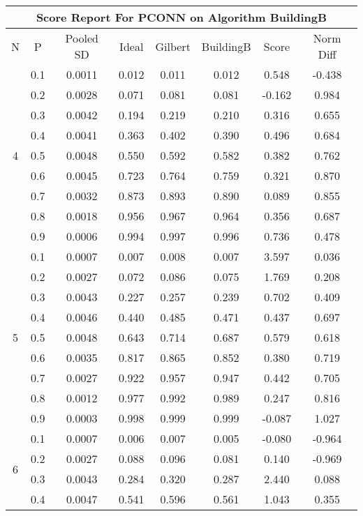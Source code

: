\documentclass[11pt,a4paper]{report}
\begin{document}
\begin{longtable}{ | c | c || c | c | c | c | c | c | }
\hline
\multicolumn{8}{|c|}{ Score Report For PCONN on Algorithm BuildingB} \\
\hline
N & P & Pooled SD &  Ideal &  Gilbert & BuildingB  & Score & Norm Diff \\
 \hline
 \hline
 \endhead
\multirow{9}{*}{4} & 0.1 & 0.0011 & 0.012 & 0.011 & 0.012 & 0.548 & -0.438 \\
 & 0.2 & 0.0028 & 0.071 & 0.081 & 0.081 & -0.162 & 0.984 \\
 & 0.3 & 0.0042 & 0.194 & 0.219 & 0.210 & 0.316 & 0.655 \\
 & 0.4 & 0.0041 & 0.363 & 0.402 & 0.390 & 0.496 & 0.684 \\
 & 0.5 & 0.0048 & 0.550 & 0.592 & 0.582 & 0.382 & 0.762 \\
 & 0.6 & 0.0045 & 0.723 & 0.764 & 0.759 & 0.321 & 0.870 \\
 & 0.7 & 0.0032 & 0.873 & 0.893 & 0.890 & 0.089 & 0.855 \\
 & 0.8 & 0.0018 & 0.956 & 0.967 & 0.964 & 0.356 & 0.687 \\
 & 0.9 & 0.0006 & 0.994 & 0.997 & 0.996 & 0.736 & 0.478 \\
 \hline
\multirow{9}{*}{5} & 0.1 & 0.0007 & 0.007 & 0.008 & 0.007 & 3.597 & 0.036 \\
 & 0.2 & 0.0027 & 0.072 & 0.086 & 0.075 & 1.769 & 0.208 \\
 & 0.3 & 0.0043 & 0.227 & 0.257 & 0.239 & 0.702 & 0.409 \\
 & 0.4 & 0.0046 & 0.440 & 0.485 & 0.471 & 0.437 & 0.697 \\
 & 0.5 & 0.0048 & 0.643 & 0.714 & 0.687 & 0.579 & 0.618 \\
 & 0.6 & 0.0035 & 0.817 & 0.865 & 0.852 & 0.380 & 0.719 \\
 & 0.7 & 0.0027 & 0.922 & 0.957 & 0.947 & 0.442 & 0.705 \\
 & 0.8 & 0.0012 & 0.977 & 0.992 & 0.989 & 0.247 & 0.816 \\
 & 0.9 & 0.0003 & 0.998 & 0.999 & 0.999 & -0.087 & 1.027 \\
 \hline
\multirow{9}{*}{6} & 0.1 & 0.0007 & 0.006 & 0.007 & 0.005 & -0.080 & -0.964 \\
 & 0.2 & 0.0027 & 0.088 & 0.096 & 0.081 & 0.140 & -0.969 \\
 & 0.3 & 0.0043 & 0.284 & 0.320 & 0.287 & 2.440 & 0.088 \\
 & 0.4 & 0.0047 & 0.541 & 0.596 & 0.561 & 1.043 & 0.355 \\

\end{longtable}
\end{document}
